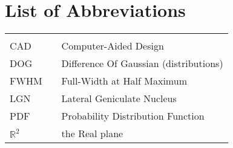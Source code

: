 \documentclass[../main.tex]{subfiles}
\begin{document}
\chapter*{List of Abbreviations}
\begin{center}
    \begin{tabular}{lll}
        \hspace*{2em}    & \hspace*{1in} & \hspace*{4.5in}                        \\
        CAD              & \dotfill      & Computer-Aided Design                  \\
        DOG              & \dotfill      & Difference Of Gaussian (distributions) \\
        FWHM             & \dotfill      & Full-Width at Half Maximum             \\
        LGN              & \dotfill      & Lateral Geniculate Nucleus             \\
        PDF              & \dotfill      & Probability Distribution Function      \\
        $\mathbb{R}^{2}$ & \dotfill      & the Real plane                         \\
    \end{tabular}
\end{center}
\cleardoublepage{}
\cleardoublepage{}


\newpage
\endofprelim
\end{document}
